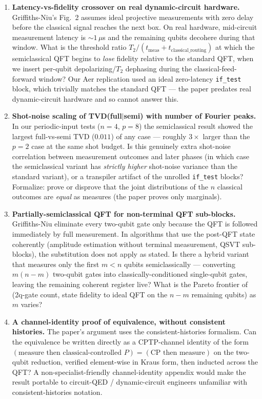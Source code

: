 \begin{enumerate}
\item[\textbf{Q1.}]\textbf{Latency-vs-fidelity crossover on real dynamic-circuit hardware.}
Griffiths-Niu's Fig.~2 assumes ideal projective measurements with zero
delay before the classical signal reaches the next box. On real hardware,
mid-circuit measurement latency is ${\sim}1\,\mu$s and the remaining qubits
decohere during that window. What is the threshold ratio
$T_2 / (t_{\text{meas}} + t_{\text{classical\_routing}})$ at which the
semiclassical QFT begins to \emph{lose} fidelity relative to the standard
QFT, when we insert per-qubit depolarizing/$T_2$ dephasing during the
classical-feed-forward window? Our Aer replication used an ideal
zero-latency \texttt{if\_test} block, which trivially matches the standard
QFT --- the paper predates real dynamic-circuit hardware and so cannot
answer this.

\item[\textbf{Q2.}]\textbf{Shot-noise scaling of TVD(full$|$semi) with number of Fourier peaks.}
In our periodic-input tests ($n=4$, $p=8$) the semiclassical result showed
the largest full-vs-semi TVD ($0.011$) of any case --- roughly $3{\times}$
larger than the $p=2$ case at the same shot budget. Is this genuinely
extra shot-noise correlation between measurement outcomes and later
phases (in which case the semiclassical variant has \emph{strictly higher}
shot-noise variance than the standard variant), or a transpiler artifact
of the unrolled \texttt{if\_test} blocks?  Formalize: prove or disprove
that the joint distributions of the $n$ classical outcomes are
\emph{equal} as measures (the paper proves only marginals).

\item[\textbf{Q3.}]\textbf{Partially-semiclassical QFT for non-terminal QFT sub-blocks.}
Griffiths-Niu eliminate every two-qubit gate only because the QFT is
followed immediately by full measurement. In algorithms that use the
post-QFT state coherently (amplitude estimation without terminal
measurement, QSVT sub-blocks), the substitution does not apply as
stated. Is there a hybrid variant that measures only the first
$m<n$ qubits semiclassically --- converting $m(n{-}m)$ two-qubit gates
into classically-conditioned single-qubit gates, leaving the remaining
coherent register live?  What is the Pareto frontier of (2q-gate count,
state fidelity to ideal QFT on the $n{-}m$ remaining qubits) as $m$
varies?

\item[\textbf{Q4.}]\textbf{A channel-identity proof of equivalence, without consistent histories.}
The paper's argument uses the consistent-histories formalism.  Can the
equivalence be written directly as a CPTP-channel identity of the form
$(\text{measure then classical-controlled }P) = (\text{CP then measure})$
on the two-qubit reduction, verified element-wise in Kraus form, then
inducted across the QFT? A non-specialist-friendly channel-identity
appendix would make the result portable to circuit-QED / dynamic-circuit
engineers unfamiliar with consistent-histories notation.


\end{enumerate}
